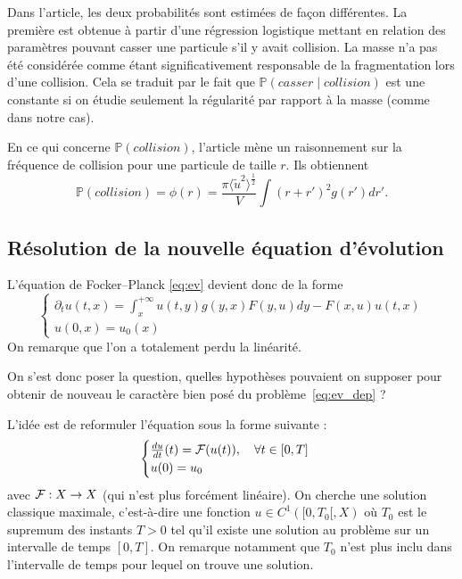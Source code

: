 Dans l'article, les deux probabilités sont estimées de façon différentes. La première est obtenue à partir d'une régression logistique mettant en relation des paramètres pouvant casser une particule s'il y avait collision.
La masse n'a pas été considérée comme étant significativement responsable de la fragmentation lors d'une collision. Cela se traduit par le fait que $\mathbb{P}(casser \mid collision)$ est une \og constante \fg{} si on étudie seulement la régularité par rapport à la masse (comme dans notre cas).

En ce qui concerne $\mathbb{P}(collision)$, l'article mène un raisonnement sur la fréquence de collision pour une particule de taille $r$. Ils obtiennent
\[
	\mathbb{P}(collision) = \phi(r) = \frac{\pi\langle \tilde{u}^2\rangle^{\frac{1}{2}}}{V} \int (r + r')^2 g(r') dr'.
\]

\subsection{Résolution de la nouvelle équation d'évolution}

\begin{important}
	L'équation de Focker--Planck \ref{eq:ev} devient donc de la forme
	\begin{equation}
		\begin{cases}
			\partial_t u(t,x) = \int_x^{+\infty} u(t,y) g(y,x) F(y,u) dy - F(x,u) u(t,x) \\
			u(0,x) = u_0(x)
		\end{cases}
		\label{eq:ev_dep}
	\end{equation}
	On remarque que l'on a totalement perdu la linéarité.
\end{important}

On s'est donc poser la question, quelles hypothèses pouvaient on supposer pour obtenir de nouveau le caractère bien posé du problème~\ref{eq:ev_dep} ?

\begin{important}
	L'idée est de reformuler l'équation sous la forme suivante :
	\begin{equation}
		\begin{cases}
			\frac{du}{dt}(t) = \mathcal{F}(u(t)), \quad \forall t \in [0,T] \\
			u(0) = u_0
		\end{cases}
		\label{eq:ev_nonop}
	\end{equation}
	avec $\mathcal{F} : X \to X$ (qui n'est plus forcément linéaire). On cherche une solution classique maximale, c'est-à-dire une fonction $u \in C^1([0,T_0[, X)$ où $T_0$ est le supremum des instants $T > 0$ tel qu'il existe une solution au problème sur un intervalle de temps $[0,T]$. On remarque notamment que $T_0$ n'est plus inclu dans l'intervalle de temps pour lequel on trouve une solution.
\end{important}

